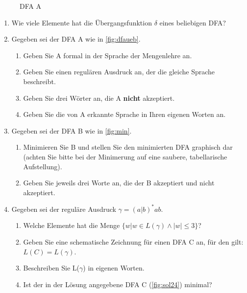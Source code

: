 \begin{figure}[ht] %
\centering %
\caption{DFA A}
\label{fig:dfaueb}

\end{figure}
\begin{enumerate}
    \item Wie viele Elemente hat die Übergangsfunktion $\delta$ eines beliebigen DFA?
    \item Gegeben sei der DFA A wie in \autoref{fig:dfaueb}.
    \begin{enumerate}
	  \item Geben Sie A formal in der Sprache der Mengenlehre an.
	  \item Geben Sie einen regulären Ausdruck an, der die gleiche Sprache beschreibt. 
	  \item Geben Sie drei Wörter an, die A \textbf{nicht} akzeptiert. 
	  \item Geben Sie die von A erkannte Sprache in Ihren eigenen Worten an. 
    \end{enumerate}            
    \item Gegeben sei der DFA B wie in \autoref{fig:min}.
        \begin{enumerate}
            \item Minimieren Sie B und stellen Sie den minimierten DFA graphisch dar
                (achten Sie bitte bei der Minimerung auf eine saubere, tabellarische Aufstellung).
            \item Geben Sie jeweils drei Worte an, die der B akzeptiert und nicht akzeptiert.
        \end{enumerate}
    \item Gegeben sei der reguläre Ausdruck $\gamma = (a|b)^*ab$.
        \begin{enumerate}
            \item Welche Elemente hat die Menge $\{w|w \in L(\gamma) \wedge |w| \leq 3\}$?
            \item Geben Sie eine schematische Zeichnung für einen DFA C an, für den gilt:
                $L(C) = L(\gamma)$.
            \item Beschreiben Sie L($\gamma$) in eigenen Worten.
            \item Ist der in der Lösung angegebene DFA C (\autoref{fig:sol24}) minimal?
        \end{enumerate}
\end{enumerate}

